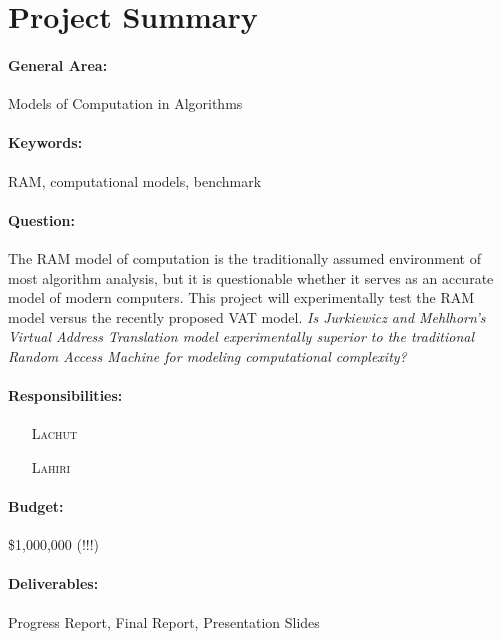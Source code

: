 \maketitle

\section{Project Summary}

\paragraph{General Area:} Models of Computation in Algorithms

\paragraph{Keywords:} RAM, computational models, benchmark

\paragraph{Question:} The RAM model of computation is the traditionally
assumed environment of most algorithm analysis, but it is questionable whether
it serves as an accurate model of modern computers. This project will
experimentally test the RAM model versus the recently proposed VAT model.
\emph{Is Jurkiewicz and Mehlhorn's Virtual Address Translation model
experimentally superior to the traditional Random Access Machine for modeling
computational complexity?}

\paragraph{Responsibilities:}
  \begin{itemize}
    \item[\textsc{Lachut}] 
    \item[\textsc{Lahiri}] 
  \end{itemize}

\paragraph{Budget:} \$1,000,000 (!!!)

\paragraph{Deliverables:} Progress Report, Final Report, Presentation Slides